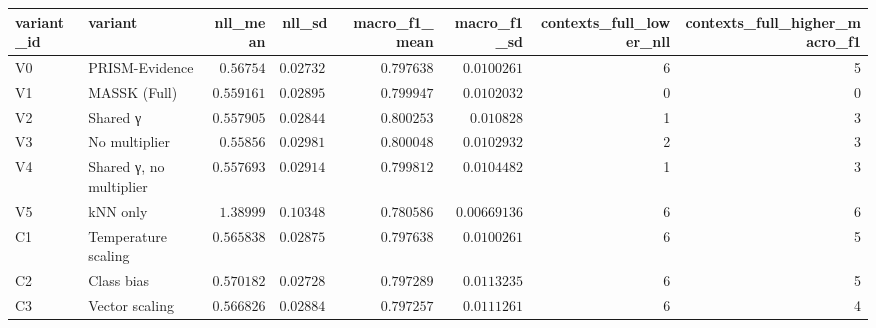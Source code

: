 \begin{tabular}{llrrrrrr}
\toprule
variant\_id & variant & nll\_mean & nll\_sd & macro\_f1\_mean & macro\_f1\_sd & contexts\_full\_lower\_nll & contexts\_full\_higher\_macro\_f1 \\
\midrule
V0 & PRISM-Evidence & $0.56754$ & $0.027329$ & $0.797638$ & $0.0100261$ & 6 & 5 \\
V1 & MASSK (Full) & $0.559161$ & $0.0289594$ & $0.799947$ & $0.0102032$ & 0 & 0 \\
V2 & Shared γ & $0.557905$ & $0.0284481$ & $0.800253$ & $0.010828$ & 1 & 3 \\
V3 & No multiplier & $0.55856$ & $0.0298103$ & $0.800048$ & $0.0102932$ & 2 & 3 \\
V4 & Shared γ, no multiplier & $0.557693$ & $0.029146$ & $0.799812$ & $0.0104482$ & 1 & 3 \\
V5 & kNN only & $1.38999$ & $0.103486$ & $0.780586$ & $0.00669136$ & 6 & 6 \\
C1 & Temperature scaling & $0.565838$ & $0.0287597$ & $0.797638$ & $0.0100261$ & 6 & 5 \\
C2 & Class bias & $0.570182$ & $0.0272859$ & $0.797289$ & $0.0113235$ & 6 & 5 \\
C3 & Vector scaling & $0.566826$ & $0.028841$ & $0.797257$ & $0.0111261$ & 6 & 4 \\
\bottomrule
\end{tabular}
